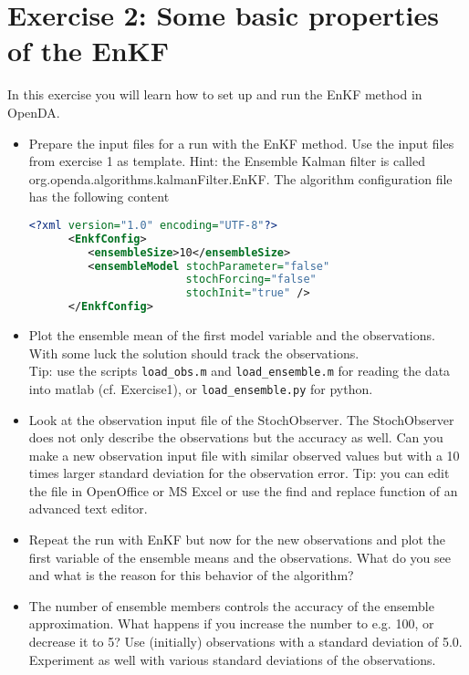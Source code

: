 \section{Exercise 2: Some basic properties of the EnKF}

In this exercise you will learn how to set up and run the EnKF method in OpenDA.

\begin{itemize}
  \item Prepare the input files for a run with the EnKF method. Use the input
        files from exercise 1 as template. Hint: the Ensemble Kalman filter
        is called org.openda.algorithms.kalmanFilter.EnKF. The algorithm
        configuration file has the following content
      \begin{lstlisting}[language=XML,frame=single,caption={XML-input for EnKF algorithm}]
      <?xml version="1.0" encoding="UTF-8"?>
      <EnkfConfig>
         <ensembleSize>10</ensembleSize>
         <ensembleModel stochParameter="false"
                        stochForcing="false"
                        stochInit="true" />
      </EnkfConfig>
      \end{lstlisting}

  \item Plot the ensemble mean of the first model variable and the observations.
        With some luck the solution should track the observations.\\
        Tip: use the scripts {\tt load\_obs.m} and {\tt load\_ensemble.m} for reading the
        data into matlab (cf. Exercise1), or {\tt load\_ensemble.py} for python.
 \item Look at the observation input file of the StochObserver. The
       StochObserver does not only describe the observations but the accuracy
       as well. Can you make a new observation input file with similar
       observed values but with a 10 times larger standard deviation for the
       observation error.
       Tip: you can edit the file in OpenOffice or MS Excel or use the find
       and replace function of an advanced text editor.
 \item Repeat the run with EnKF but now for the new observations and plot
       the first variable of the ensemble means and the observations. What do
       you see and what is the reason for this behavior of the algorithm?
 \item The number of ensemble members controls the accuracy of the ensemble
       approximation. What happens if you increase the number to e.g. 100, or
       decrease it to 5? Use (initially) observations with a standard deviation
       of 5.0. Experiment as well with various standard
       deviations of the observations.
\end{itemize}


